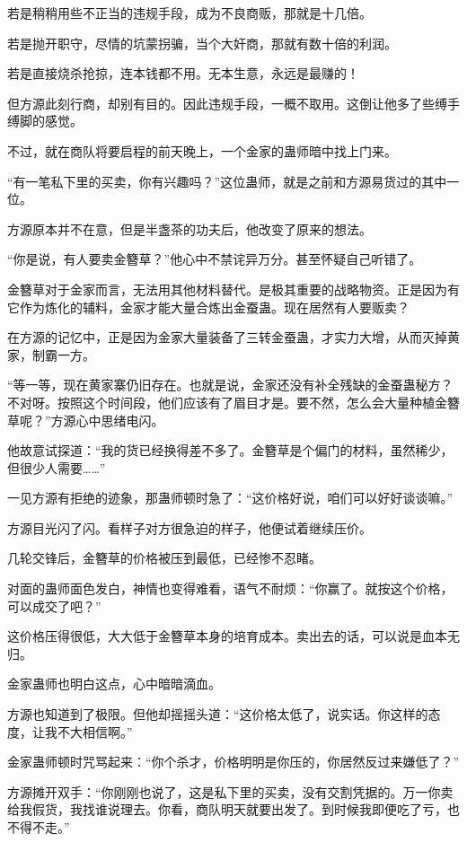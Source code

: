 \begin{this_body}
若是稍稍用些不正当的违规手段，成为不良商贩，那就是十几倍。

若是抛开职守，尽情的坑蒙拐骗，当个大奸商，那就有数十倍的利润。

若是直接烧杀抢掠，连本钱都不用。无本生意，永远是最赚的！

但方源此刻行商，却别有目的。因此违规手段，一概不取用。这倒让他多了些缚手缚脚的感觉。

不过，就在商队将要启程的前天晚上，一个金家的蛊师暗中找上门来。

“有一笔私下里的买卖，你有兴趣吗？”这位蛊师，就是之前和方源易货过的其中一位。

方源原本并不在意，但是半盏茶的功夫后，他改变了原来的想法。

“你是说，有人要卖金簪草？”他心中不禁诧异万分。甚至怀疑自己听错了。

金簪草对于金家而言，无法用其他材料替代。是极其重要的战略物资。正是因为有它作为炼化的辅料，金家才能大量合炼出金蚕蛊。现在居然有人要贩卖？

在方源的记忆中，正是因为金家大量装备了三转金蚕蛊，才实力大增，从而灭掉黄家，制霸一方。

“等一等，现在黄家寨仍旧存在。也就是说，金家还没有补全残缺的金蚕蛊秘方？不对呀。按照这个时间段，他们应该有了眉目才是。要不然，怎么会大量种植金簪草呢？”方源心中思绪电闪。

他故意试探道：“我的货已经换得差不多了。金簪草是个偏门的材料，虽然稀少，但很少人需要……”

一见方源有拒绝的迹象，那蛊师顿时急了：“这价格好说，咱们可以好好谈谈嘛。”

方源目光闪了闪。看样子对方很急迫的样子，他便试着继续压价。

几轮交锋后，金簪草的价格被压到最低，已经惨不忍睹。

对面的蛊师面色发白，神情也变得难看，语气不耐烦：“你赢了。就按这个价格，可以成交了吧？”

这价格压得很低，大大低于金簪草本身的培育成本。卖出去的话，可以说是血本无归。

金家蛊师也明白这点，心中暗暗滴血。

方源也知道到了极限。但他却摇摇头道：“这价格太低了，说实话。你这样的态度，让我不大相信啊。”

金家蛊师顿时咒骂起来：“你个杀才，价格明明是你压的，你居然反过来嫌低了？”

方源摊开双手：“你刚刚也说了，这是私下里的买卖，没有交割凭据的。万一你卖给我假货，我找谁说理去。你看，商队明天就要出发了。到时候我即便吃了亏，也不得不走。”


\end{this_body}
